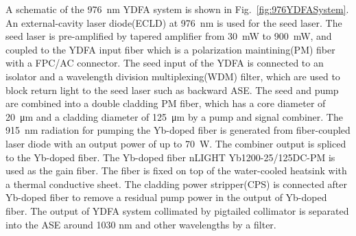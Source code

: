 \documentclass{osa-article}
\begin{document}
A schematic of the \SI{976}{\nm} YDFA system is shown in Fig.~\ref{fig:976YDFASystem}.
An external-cavity laser diode(ECLD) at \SI{976}{\nm} is used for the seed laser.
The seed laser is pre-amplified by tapered amplifier from \SI{30}{\mW} to \SI{900}{\mW}, and coupled to the YDFA input fiber which is a polarization maintining(PM) fiber with a FPC/AC connector.
The seed input of the YDFA is connected to an isolator and a wavelength division multiplexing(WDM) filter, which are used to block return light to the seed laser such as backward ASE.
The seed and pump are combined into a double cladding PM fiber, which has a core diameter of \SI{20}{\um} and a cladding diameter of \SI{125}{\um} by a pump and signal combiner.
The \SI{915}{\nm} radiation for pumping the Yb-doped fiber is generated from fiber-coupled laser diode with an output power of up to \SI{70}{\W}.
The combiner output is spliced to the Yb-doped fiber.
The Yb-doped fiber nLIGHT Yb1200-25/125DC-PM is used as the gain fiber.
The fiber is fixed on top of the water-cooled heatsink with a thermal conductive sheet.
The cladding power stripper(CPS) is connected after Yb-doped fiber to remove a residual pump power in the output of Yb-doped fiber.
The output of YDFA system collimated by pigtailed collimator is separated into the ASE around 1030 nm and other wavelengths by a filter.

\end{document}
